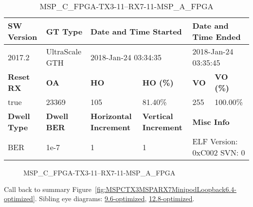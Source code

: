 \begin{table}[h]
\centering
\caption{MSP\_C\_FPGA-TX3-11--RX7-11-MSP\_A\_FPGA}
\label{tab:MSPCFPGATX311RX711MSPAFPGA6.4-optimized}
\begin{tabular}{@{}|l|l|l|l|l|l|@{}}
\toprule
\textbf{SW Version}                & \textbf{GT Type}   & \multicolumn{2}{l|}{\textbf{Date and Time Started}}            & \multicolumn{2}{l|}{\textbf{Date and Time Ended}}        \\ \midrule
2017.2                       & UltraScale GTH          & \multicolumn{2}{l|}{2018-Jan-24 03:34:35}                   & \multicolumn{2}{l|}{2018-Jan-24 03:35:45}               \\ \midrule
\textbf{Reset RX}                  & \textbf{OA} & \textbf{HO}   & \textbf{HO (\%)} & \textbf{VO} & \textbf{VO (\%)} \\ \midrule
true & 23369        & 105          & 81.40\%        & 255        & 100.00\%       \\ \midrule
\textbf{Dwell Type}                & \textbf{Dwell BER} & \textbf{Horizontal Increment} & \textbf{Vertical Increment}    & \multicolumn{2}{l|}{\textbf{Misc Info}}                  \\ \midrule
BER                            & 1e-7        & 1        & 1           & \multicolumn{2}{l|}{ELF Version: 0xC002 SVN: 0}                         \\ \bottomrule
\end{tabular}
\end{table}

\begin{figure}[h]
\caption{MSP\_C\_FPGA-TX3-11--RX7-11-MSP\_A\_FPGA} \label{fig:MSPCFPGATX311RX711MSPAFPGA6.4-optimized}
\end{figure}

Call back to summary Figure~\ref{fig:MSPCTX3MSPARX7MinipodLoopback6.4-optimized}.
Sibling eye diagrams: \hyperref[sec:MSPCFPGATX311RX711MSPAFPGA9.6-optimized]{9.6-optimized}, \hyperref[sec:MSPCFPGATX311RX711MSPAFPGA12.8-optimized]{12.8-optimized}.

\clearpage
\newpage

